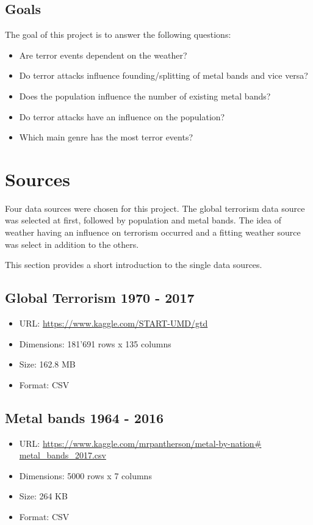 \subsection{Goals}
The goal of this project is to answer the following questions:
\begin{itemize}
	\item Are terror events dependent on the weather?
	\item Do terror attacks influence founding/splitting of metal bands and vice versa?
	\item Does the population influence the number of existing metal bands?
	\item Do terror attacks have an influence on the population?
	\item Which main genre has the most terror events?
\end{itemize}

\section{Sources}
Four data sources were chosen for this project. The global terrorism data source was selected at first, followed by population and metal bands. The idea of weather having an influence on terrorism occurred and a fitting weather source was select in addition to the others.

This section provides a short introduction to the single data sources.

\subsection{Global Terrorism 1970 - 2017}
\begin{itemize}
	\item URL: \url{https://www.kaggle.com/START-UMD/gtd}
	\item Dimensions: 181'691 rows x 135 columns
	\item Size: 162.8 MB
	\item Format: CSV
\end{itemize}
	
\subsection{Metal bands 1964 - 2016}
\begin{itemize}
	\item URL: \url{https://www.kaggle.com/mrpantherson/metal-by-nation# metal_bands_2017.csv}
	\item Dimensions: 5000 rows x 7 columns
	\item Size: 264 KB
	\item Format: CSV
\end{itemize}

